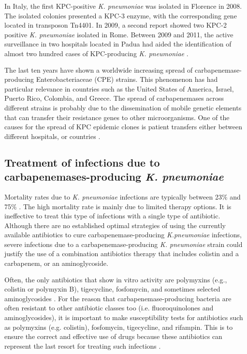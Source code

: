 \documentclass[11pt]{report}
\begin{document}
In Italy, the first KPC-positive \emph{K. pneumoniae} was isolated in Florence in 2008.
The isolated colonies presented a KPC-3 enzyme, with the corresponding gene located in transposon Tn4401.
In 2009, a second report showed two KPC-2 positive \emph{K. pneumoniae} isolated in Rome.
Between 2009 and 2011, the active surveillance in two hospitals located in Padua had aided the identification of almost two hundred cases of KPC-producing \emph{K. pneumoniae} \cite{munozPrice2013}.

The last ten years have shown a worldwide increasing spread of carbapenemase-producing Enterobacteriaceae (CPE) strains.
This phenomenon has had particular relevance in countries such as the United States of America, Israel, Puerto Rico, Colombia, and Greece.
The spread of carbapenemases across different strains is probably due to the dissemination of mobile genetic elements that can transfer their resistance genes to other microorganisms.
One of the causes for the spread of KPC epidemic clones is patient transfers either between different hospitals, or countries \cite{circolare2013}.

\clearpage
\subsection{Treatment of infections due to carbapenemases-producing \emph{K. pneumoniae}}
Mortality rates due to \emph{K. pneumoniae} infections are typically between 23$\%$ and 75$\%$ \cite{karaiskos2014multidrug}.
The high mortality rate is mainly due to limited therapy options.
It is ineffective to treat this type of infections with a single type of antibiotic.
Although there are no established optimal strategies of using the currently available antibiotics to cure carbapenemase-producing \emph{K.pneumoniae} infections, severe infections due to a carbapenemase-producing \emph{K. pneumoniae} strain could justify the use of a combination antibiotics therapy that includes colistin and a carbapenem, or an aminoglycoside.

Often, the only antibiotics that show in vitro activity are polymyxins (e.g., colistin or polymyxin B), tigecycline, fosfomycin, and sometimes selected aminoglycosides \cite{rodriguez2015diagnosis}.
For the reason that carbapenemase-producing bacteria are often resistant to other antibiotic classes too (i.e. fluoroquinolones and aminoglycosides), it is important to make susceptibility tests for antibiotics such as polymyxins (e.g. colistin), fosfomycin, tigecycline, and rifampin.
This is to ensure the correct and effective use of drugs because these antibiotics can represent the last resort for treating such infections \cite{adams2009activity}.
\end{document}

